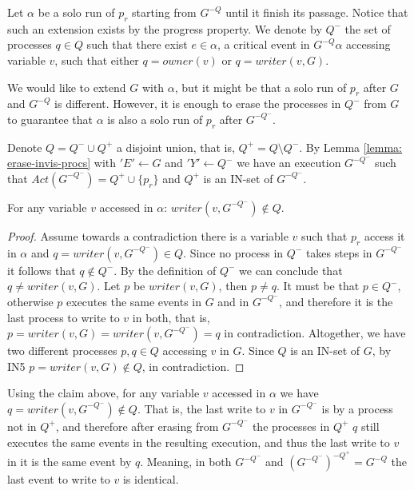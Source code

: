 Let $\alpha$ be a solo run of $p_r$ starting from $G^{-Q}$ until it finish its passage. Notice that such an extension exists by the progress property. We denote by $Q^-$ the set of processes $q \in Q$ such that there exist $e \in \alpha$, a critical event in $G^{-Q} \alpha$ accessing variable $v$, such that either $q = owner(v)$ or $q = writer(v,G)$.

We would like to extend $G$ with $\alpha$, but it might be that a solo run of $p_r$ after $G$ and $G^{-Q}$ is different. However, it is enough to erase the processes in $Q^-$ from $G$ to guarantee that $\alpha$ is also a solo run of $p_r$ after $G^{-Q^-}$.

Denote $Q = Q^- \cup Q^+$ a disjoint union, that is, $Q^+ = Q \setminus Q^-$. By Lemma \ref{lemma: erase-invis-procs} with $'E' \leftarrow G$ and $'Y' \leftarrow Q^-$ we have an execution $G^{-Q^-}$ such that $Act(G^{-Q^-}) = Q^+ \cup \{p_r\}$ and $Q^+$ is an IN-set of $G^{-Q^-}$.


\begin{claim-subsection} \label{claim: v-access-in-alpha}
	For any variable $v$ accessed in $\alpha$: $writer(v,G^{-Q^-}) \notin Q$.
\end{claim-subsection}

\begin{proof}
	Assume towards a contradiction there is a variable $v$ such that $p_r$ access it in $\alpha$ and $q = writer(v,G^{-Q^-}) \in Q$. Since no process in $Q^-$ takes steps in $G^{-Q^-}$ it follows that $q \notin Q^-$. By the definition of $Q^-$ we can conclude that $q \neq writer(v,G)$. Let $p$ be $writer(v,G)$, then $p \neq q$. It must be that $p \in Q^-$, otherwise $p$ executes the same events in $G$ and in $G^{-Q^-}$, and therefore it is the last process to write to $v$ in both, that is, $p = writer(v,G) = writer(v,G^{-Q^-}) = q$ in contradiction.
	Altogether, we have two different processes $p,q \in Q$ accessing $v$ in $G$. Since $Q$ is an IN-set of $G$, by IN5 $p = writer(v,G) \notin Q$, in contradiction.
\end{proof}

Using the claim above, for any variable $v$ accessed in $\alpha$ we have $q = writer(v,G^{-Q^-}) \notin Q$. That is, the last write to $v$ in $G^{-Q^-}$ is by a process not in $Q^+$, and therefore after erasing from $G^{-Q^-}$ the processes in $Q^+$ $q$ still executes the same events in the resulting execution, and thus the last write to $v$ in it is the same event by $q$. Meaning, in both $G^{-Q^-}$ and $(G^{-Q^-})^{-Q^+} = G^{-Q}$ the last event to write to $v$ is identical.

